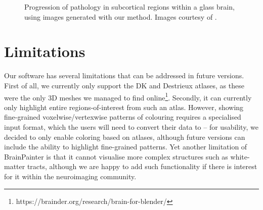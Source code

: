 \documentclass{llncs}
\begin{document}
\begin{figure}[htp]
\centering
 \caption{Progression of pathology in subcortical regions within a glass brain, using images generated with our method. Images courtesy of \cite{wijeratne2018image}.}
   \label{fig:peter}
\end{figure}

\section{Limitations}

Our software has several limitations that can be addressed in future versions. First of all, we currently only support the DK and Destrieux atlases, as these were the only 3D meshes we managed to find online\footnote{https://brainder.org/research/brain-for-blender/}. Secondly, it can currently only highlight entire regions-of-interest from such an atlas. However, showing fine-grained voxelwise/vertexwise patterns of colouring requires a specialised input format, which the users will need to convert their data to -- for usability, we decided to only enable coloring based on atlases, although future versions can include the ability to highlight fine-grained patterns. Yet another limitation of BrainPainter is that it cannot visualise more complex structures such as white-matter tracts, although we are happy to add such functionality if there is interest for it within the neuroimaging community.
\end{document}
